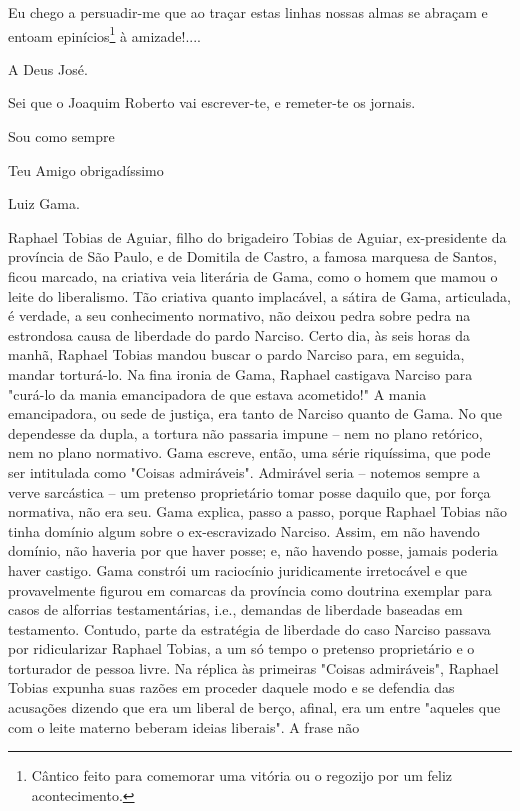 Eu chego a persuadir-me que ao traçar estas linhas nossas almas se
abraçam e entoam epinícios\footnote{Cântico feito para comemorar uma
  vitória ou o regozijo por um feliz acontecimento.}
à amizade!....

A Deus José.

Sei que o Joaquim Roberto vai escrever-te, e remeter-te os jornais.

Sou como sempre

Teu Amigo obrigadíssimo

Luiz Gama.

\pagebreak
\mbox{}\vfill
\thispagestyle{empty}

{\small\noindent
Raphael Tobias de Aguiar, filho do brigadeiro Tobias de Aguiar,
ex-presidente da província de São Paulo, e de Domitila de Castro, a
famosa marquesa de Santos, ficou marcado, na criativa veia literária de
Gama, como o homem que mamou o leite do liberalismo. Tão criativa quanto
implacável, a sátira de Gama, articulada, é verdade, a seu conhecimento
normativo, não deixou pedra sobre pedra na estrondosa causa de liberdade
do pardo Narciso. Certo dia, às seis horas da manhã, Raphael Tobias
mandou buscar o pardo Narciso para, em seguida, mandar torturá-lo. Na
fina ironia de Gama, Raphael castigava Narciso para "curá-lo da mania
emancipadora de que estava acometido!" A mania emancipadora, ou sede de
justiça, era tanto de Narciso quanto de Gama. No que dependesse da
dupla, a tortura não passaria impune -- nem no plano retórico, nem no
plano normativo. Gama escreve, então, uma série riquíssima, que pode ser
intitulada como "Coisas admiráveis". Admirável seria -- notemos sempre a
verve sarcástica -- um pretenso proprietário tomar posse daquilo que,
por força normativa, não era seu. Gama explica, passo a passo, porque
Raphael Tobias não tinha domínio algum sobre o ex-escravizado Narciso.
Assim, em não havendo domínio, não haveria por que haver posse; e, não
havendo posse, jamais poderia haver castigo. Gama constrói um raciocínio
juridicamente irretocável e que provavelmente figurou em comarcas da
província como doutrina exemplar para casos de alforrias testamentárias,
i.e., demandas de liberdade baseadas em testamento. Contudo, parte da
estratégia de liberdade do caso Narciso passava por ridicularizar
Raphael Tobias, a um só tempo o pretenso proprietário e o torturador de
pessoa livre. Na réplica às primeiras "Coisas admiráveis", Raphael
Tobias expunha suas razões em proceder daquele modo e se defendia das
acusações dizendo que era um liberal de berço, afinal, era um entre
"aqueles que com o leite materno beberam ideias liberais". A frase não
}
